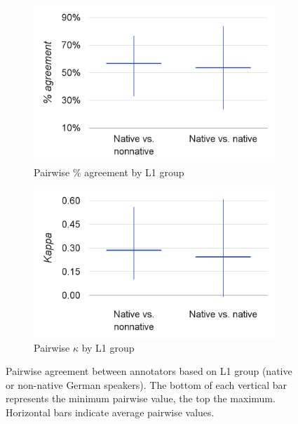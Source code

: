 		\begin{figure}[p]
			\centering
			\begin{subfigure}{.7\textwidth}
				\centering
				\includegraphics[width=\textwidth]{img/annotation/pairAgreeL1-noTitle}
				\caption{Pairwise \% agreement by L1 group}
				\label{fig:agreement:L1:pct}
			\end{subfigure}%

			\vspace{2em}			
			
			\begin{subfigure}{.7\textwidth}
				\centering
				\includegraphics[width=\textwidth]{img/annotation/pairKappaL1-noTitle}
				\caption{Pairwise $\kappa$ by L1 group}
				\label{fig:agreement:L1:k}
			\end{subfigure}%
			
			\vspace{1.5em}
			
			\caption[Pairwise agreement statistics by annotator L1 group]{Pairwise agreement between annotators based on L1 group (native or non-native German speakers).
	The bottom of each vertical bar represents the minimum pairwise value, the top the maximum. Horizontal bars indicate average pairwise values.
			}
			\label{fig:agreement:L1}
		\end{figure}
		
